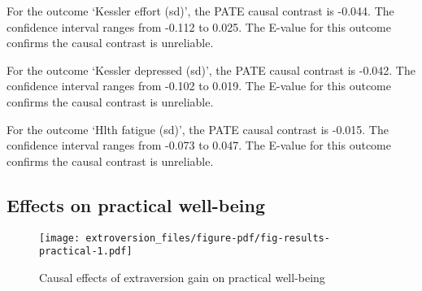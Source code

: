 \documentclass[
  singlecolumn]{report}
\begin{document}
For the outcome `Kessler effort (sd)', the PATE causal contrast is
-0.044. The confidence interval ranges from -0.112 to 0.025. The E-value
for this outcome confirms the causal contrast is unreliable.

For the outcome `Kessler depressed (sd)', the PATE causal contrast is
-0.042. The confidence interval ranges from -0.102 to 0.019. The E-value
for this outcome confirms the causal contrast is unreliable.

For the outcome `Hlth fatigue (sd)', the PATE causal contrast is -0.015.
The confidence interval ranges from -0.073 to 0.047. The E-value for
this outcome confirms the causal contrast is unreliable.

\hypertarget{effects-on-practical-well-being}{%
\subsection{Effects on practical
well-being}\label{effects-on-practical-well-being}}

\begin{figure}

{\centering \texttt{[image: extroversion\_files/figure-pdf/fig-results-practical-1.pdf]}

}

\caption{\label{fig-results-practical}Causal effects of extraversion
gain on practical well-being}

\end{figure}
\end{document}

